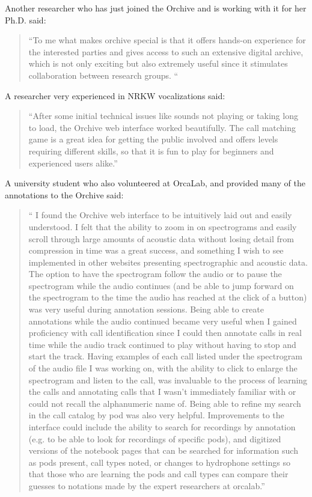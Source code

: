 Another researcher who has just joined the Orchive and is working with
it for her Ph.D. said:

\begin{quote}
	``To me what makes orchive special is that it offers hands-on
  experience for the interested parties and gives access to such an
  extensive digital archive, which is not only exciting but also
  extremely useful since it stimulates collaboration between research
  groups. ``
\end{quote}		

A researcher very experienced in NRKW vocalizations said:

\begin{quote}
``After some initial technical issues like sounds not playing or
taking long to load, the Orchive web interface worked beautifully. The
call matching game is a great idea for getting the public involved and
offers levels requiring different skills, so that it is fun to play
for beginners and experienced users alike.''
\end{quote}

A university student who also volunteered at OrcaLab, and provided
many of the annotations to the Orchive said:

\begin{quote}
`` I found the Orchive web interface to be intuitively laid out and
  easily understood. I felt that the ability to zoom in on
  spectrograms and easily scroll through large amounts of acoustic
  data without losing detail from compression in time was a great
  success, and something I wish to see implemented in other websites
  presenting spectrographic and acoustic data.  The option to have the
  spectrogram follow the audio or to pause the spectrogram while the
  audio continues (and be able to jump forward on the spectrogram to
  the time the audio has reached at the click of a button) was very
  useful during annotation sessions. Being able to create annotations
  while the audio continued became very useful when I gained
  proficiency with call identification since I could then annotate
  calls in real time while the audio track continued to play without
  having to stop and start the track. Having examples of each call
  listed under the spectrogram of the audio file I was working on,
  with the ability to click to enlarge the spectrogram and listen to
  the call, was invaluable to the process of learning the calls and
  annotating calls that I wasn't immediately familiar with or could
  not recall the alphanumeric name of.  Being able to refine my search
  in the call catalog by pod was also very helpful. Improvements to
  the interface could include the ability to search for recordings by
  annotation (e.g. to be able to look for recordings of specific
  pods), and digitized versions of the notebook pages that can be
  searched for information such as pods present, call types noted, or
  changes to hydrophone settings so that those who are learning the
  pods and call types can compare their guesses to notations made by
  the expert researchers at orcalab.''
\end{quote}


